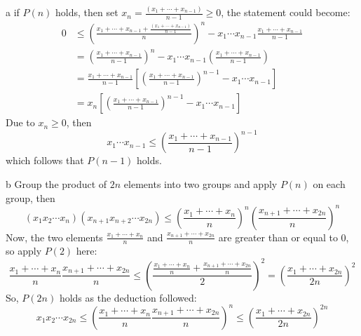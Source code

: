 \documentclass[a4paper,12pt]{article}
\makeatletter
\newtheorem*{solution}{Solution}
\theoremstyle{definition}
\renewenvironment{solution}[1][Solution] {\par\pushQED{\qed}\normalfont\topsep6\p@\@plus6\p@\relax\trivlist\item[\hskip\labelsep\bfseries#1\@addpunct{.}]\ignorespaces}{\popQED\endtrivlist\@endpefalse} \makeatother
\newenvironment{problems}{\begin{list}{}{\renewcommand{\makelabel}[1]{\textbf{##1}\hfil}}}{\end{list}}
\newenvironment{steps}{\begin{list}{}{\renewcommand{\makelabel}[1]{\textbf{##1}\hfil}}}{\end{list}}
\makeatother
\begin{document}
\begin{problems}
\begin{solution}
        \begin{steps}
            \item[a] if $P(n)$ holds, then set $x_n=\frac{(x_1+\cdots+x_{n-1})}{n-1}\geq 0$, the statement could become:
            \begin{align*}
                0&\leq \left(\frac{x_1+\cdots+x_{n-1}+\frac{(x_1+\cdots+x_{n-1})}{n-1}}{n}\right)^n - x_1\cdots x_{n-1}\frac{x_1+\cdots+x_{n-1}}{n-1}\\
                &= \left(\frac{x_1+\cdots+x_{n-1}}{n-1}\right)^n- x_1\cdots x_{n-1}\left(\frac{x_1+\cdots+x_{n-1}}{n-1}\right)\\
                &= \frac{x_1+\cdots+x_{n-1}}{n-1} \left[\left(\frac{x_1+\cdots+x_{n-1}}{n-1}\right)^{n-1}-x_1\cdots x_{n-1}\right]\\
                &=x_n\left[\left(\frac{x_1+\cdots+x_{n-1}}{n-1}\right)^{n-1}-x_1\cdots x_{n-1}\right]
            \end{align*}
            Due to $x_n\geq 0$, then
            \begin{equation*}
                x_1\cdots x_{n-1}\leq \left(\frac{x_1+\cdots+x_{n-1}}{n-1}\right)^{n-1}
            \end{equation*}
            which follows that $P(n-1)$ holds.
            \item[b] 
            Group the product of $2n$ elements into two groups and apply $P(n)$ on each group, then 
            \begin{equation*}
                (x_1x_2\cdots x_{n})(x_{n+1}x_{n+2}\cdots x_{2n})\leq \left(\frac{x_1+\cdots+x_n}{n}\right)^n \left(\frac{x_{n+1}+\cdots+x_{2n}}{n}\right)^n
            \end{equation*} 
            Now, the two elements $\frac{x_1+\cdots+x_n}{n}$ and $\frac{x_{n+1}+\cdots+x_{2n}}{n}$ are greater than or equal to 0, so apply $P(2)$ here:
            \begin{equation*}
                \frac{x_1+\cdots+x_n}{n} \frac{x_{n+1}+\cdots+x_{2n}}{n} \leq \left(\frac{\frac{x_1+\cdots+x_n}{n}+\frac{x_{n+1}+\cdots+x_{2n}}{n}}{2}\right)^2 = \left(\frac{x_1+\cdots+x_{2n}}{2n}\right)^2
            \end{equation*}
            So, $P(2n)$ holds as the deduction followed:
            \begin{equation*}
                x_1x_2\cdots x_{2n} \leq \left( \frac{x_1+\cdots+x_n}{n} \frac{x_{n+1}+\cdots+x_{2n}}{n}\right)^n \leq \left(\frac{x_1+\cdots+x_{2n}}{2n}\right)^{2n}
            \end{equation*} 

\end{steps}
\end{solution}
\end{problems}
\end{document}
